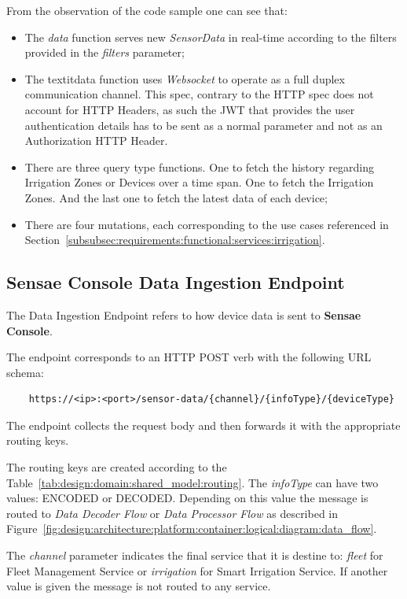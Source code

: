 From the observation of the code sample one can see that:

\begin{itemize}
    \item The \textit{data} function serves new \textit{SensorData} in real-time according to the filters provided in the \textit{filters} parameter;
    \item The textit{data} function uses \textit{Websocket} to operate as a full duplex communication channel. This spec, contrary to the HTTP spec does not account for HTTP Headers, as such the \gls{JWT} that provides the user authentication details has to be sent as a normal parameter and not as an Authorization HTTP Header.
    \item  There are three query type functions. One to fetch the history regarding Irrigation Zones or Devices over a time span. One to fetch the Irrigation Zones. And the last one to fetch the latest data of each device;
    \item There are four mutations, each corresponding to the use cases referenced in Section~\ref{subsubsec:requirements:functional:services:irrigation}.
\end{itemize}

\subsection{Sensae Console Data Ingestion Endpoint}
\label{subsec:implementation:description:ingestion}

The Data Ingestion Endpoint refers to how device data is sent to \textbf{Sensae Console}.

The endpoint corresponds to an HTTP POST verb with the following \gls{URL} schema:

\begin{verbatim}
    https://<ip>:<port>/sensor-data/{channel}/{infoType}/{deviceType}
\end{verbatim}

The endpoint collects the request body and then forwards it with the appropriate routing keys.

The routing keys are created according to the Table~\ref{tab:design:domain:shared_model:routing}. The \textit{infoType} can have two values: ENCODED or DECODED. Depending on this value the message is routed to \textit{Data Decoder Flow} or \textit{Data Processor Flow} as described in Figure~\ref{fig:design:architecture:platform:container:logical:diagram:data_flow}.

The \textit{channel} parameter indicates the final service that it is destine to: \textit{fleet} for Fleet Management Service or \textit{irrigation} for Smart Irrigation Service. If another value is given the message is not routed to any service.

